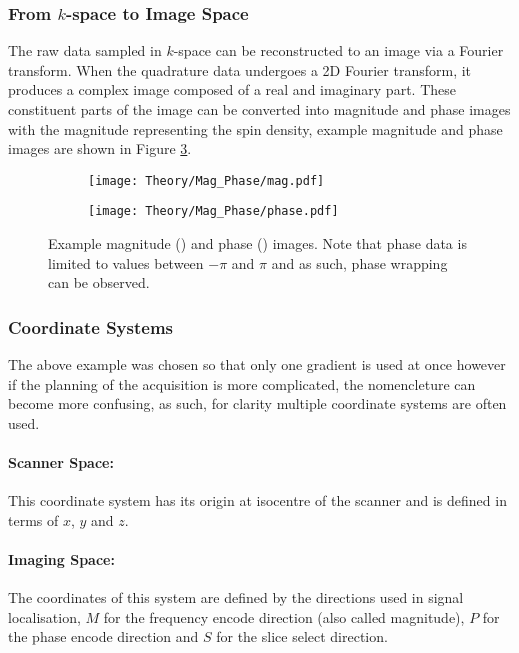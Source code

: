 \subsubsection{From $k$-space to Image Space}

The raw data sampled in $k$-space can be reconstructed to an image via a Fourier transform. When the quadrature data undergoes a 2D Fourier transform, it produces a complex image composed of a real and imaginary part. These constituent parts of the image can be converted into magnitude and phase images with the magnitude representing the spin density, example magnitude and phase images are shown in Figure \ref{fig:theory_mag_phase}.

\begin{figure}[H]
	\centering
	\begin{subfigure}[c]{0.47\textwidth}
		\centering
		\texttt{[image: Theory/Mag\_Phase/mag.pdf]}
		\caption{}
		\label{fig:theory_mag_phase_mag}
	\end{subfigure}
	\hfill
	\begin{subfigure}[c]{0.47\textwidth}
		\centering
		\texttt{[image: Theory/Mag\_Phase/phase.pdf]}
		\caption{}
		\label{fig:theory_mag_phase_phase}
	\end{subfigure}
	\caption{Example magnitude () and phase () images. Note that phase data is limited to values between $-\pi$ and $\pi$ and as such, phase wrapping can be observed.}
	\label{fig:theory_mag_phase}
\end{figure}

\subsubsection{Coordinate Systems}
The above example was chosen so that only one gradient is used at once however if the planning of the acquisition is more complicated, the nomencleture can become more confusing, as such, for clarity multiple coordinate systems are often used.
\paragraph{Scanner Space:}
This coordinate system has its origin at isocentre of the scanner and is defined in terms of $x$, $y$ and $z$.
\paragraph{Imaging Space:}
The coordinates of this system are defined by the directions used in signal localisation, $M$ for the frequency encode direction (also called magnitude), $P$ for the phase encode direction and $S$ for the slice select direction.
